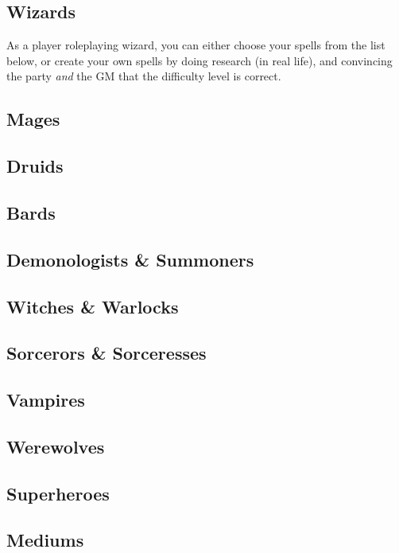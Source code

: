 \documentclass{LegrandOrangeTufteBook}
\newcommand{\termClass}[1]{\textcolor{xkcdSpearmint}{#1}}
\begin{document}
\subsection*{Wizards}

As a player roleplaying \termClass{wizard}, you can either choose your spells from the list below,
or create your own spells by doing research (in real life), and convincing the party \emph{and} the GM
that the difficulty level is correct.

\subsection*{Mages}

\subsection*{Druids}

\subsection*{Bards}

\subsection*{Demonologists \& Summoners}

\subsection*{Witches \& Warlocks}

\subsection*{Sorcerors \& Sorceresses}

\subsection*{Vampires}

\subsection*{Werewolves}

\subsection*{Superheroes}

\subsection*{Mediums}
\end{document}
